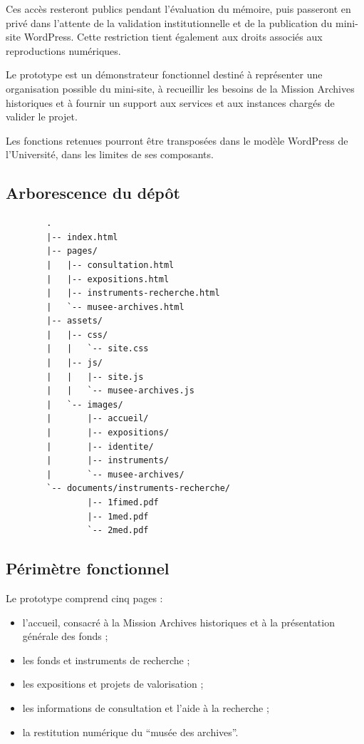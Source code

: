 Ces accès resteront publics pendant l'évaluation du mémoire, puis passeront en privé dans l'attente de la validation institutionnelle et de la publication du mini-site WordPress. Cette restriction tient également aux droits associés aux reproductions numériques.

Le prototype est un démonstrateur fonctionnel destiné à représenter une organisation possible du mini-site, à recueillir les besoins de la Mission Archives historiques et à fournir un support aux services et aux instances chargés de valider le projet.

Les fonctions retenues pourront être transposées dans le modèle WordPress de l'Université, dans les limites de ses composants.

\subsection{Arborescence du dépôt}

\begin{minipage}{\textwidth}
	\footnotesize
	\begin{verbatim}
		.
		|-- index.html
		|-- pages/
		|   |-- consultation.html
		|   |-- expositions.html
		|   |-- instruments-recherche.html
		|   `-- musee-archives.html
		|-- assets/
		|   |-- css/
		|   |   `-- site.css
		|   |-- js/
		|   |   |-- site.js
		|   |   `-- musee-archives.js
		|   `-- images/
		|       |-- accueil/
		|       |-- expositions/
		|       |-- identite/
		|       |-- instruments/
		|       `-- musee-archives/
		`-- documents/instruments-recherche/
				|-- 1fimed.pdf
				|-- 1med.pdf
				`-- 2med.pdf
	\end{verbatim}
\end{minipage}

\subsection{Périmètre fonctionnel}

Le prototype comprend cinq pages :

\begin{itemize}
	\item l'accueil, consacré à la Mission Archives historiques et à la présentation générale des fonds ;
	\item les fonds et instruments de recherche ;
	\item les expositions et projets de valorisation ;
	\item les informations de consultation et l'aide à la recherche ;
	\item la restitution numérique du \enquote{musée des archives}.
\end{itemize}

